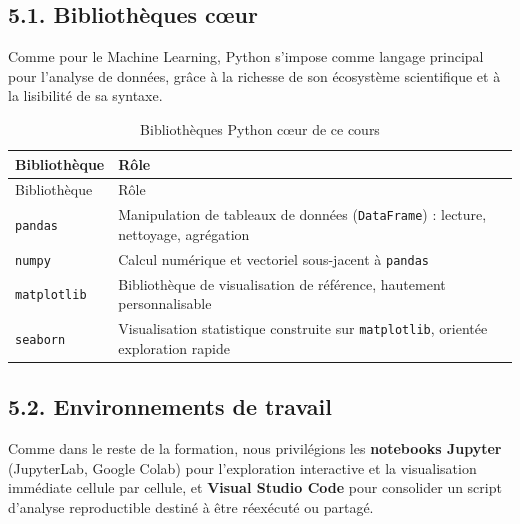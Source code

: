 \documentclass[
  french,
  letterpaper,
  open=any]{scrbook}
\theoremstyle{definition}
\theoremstyle{definition}
\theoremstyle{remark}
\begin{document}
\subsection{5.1. Bibliothèques cœur}\label{bibliothuxe8ques-cux153ur}

Comme pour le Machine Learning, Python s'impose comme langage principal
pour l'analyse de données, grâce à la richesse de son écosystème
scientifique et à la lisibilité de sa syntaxe.

\begin{longtable}[]{@{}
  >{\raggedright\arraybackslash}p{}
  >{\raggedright\arraybackslash}p{}@{}}
\caption{Bibliothèques Python cœur de ce
cours}\label{tbl-bibliotheques-eda}\tabularnewline
\toprule\noalign{}
\begin{minipage}[b]{\linewidth}\raggedright
Bibliothèque
\end{minipage} & \begin{minipage}[b]{\linewidth}\raggedright
Rôle
\end{minipage} \\
\midrule\noalign{}
\endfirsthead
\toprule\noalign{}
\begin{minipage}[b]{\linewidth}\raggedright
Bibliothèque
\end{minipage} & \begin{minipage}[b]{\linewidth}\raggedright
Rôle
\end{minipage} \\
\midrule\noalign{}
\endhead
\bottomrule\noalign{}
\endlastfoot
\texttt{pandas} & Manipulation de tableaux de données
(\texttt{DataFrame}) : lecture, nettoyage, agrégation \\
\texttt{numpy} & Calcul numérique et vectoriel sous-jacent à
\texttt{pandas} \\
\texttt{matplotlib} & Bibliothèque de visualisation de référence,
hautement personnalisable \\
\texttt{seaborn} & Visualisation statistique construite sur
\texttt{matplotlib}, orientée exploration rapide \\
\end{longtable}

\subsection{5.2. Environnements de
travail}\label{environnements-de-travail}

Comme dans le reste de la formation, nous privilégions les
\textbf{notebooks Jupyter} (JupyterLab, Google Colab) pour l'exploration
interactive et la visualisation immédiate cellule par cellule, et
\textbf{Visual Studio Code} pour consolider un script d'analyse
reproductible destiné à être réexécuté ou partagé.
\end{document}
